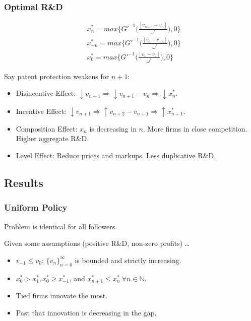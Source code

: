 \documentclass{beamer}
\begin{document}
\begin{frame}[t]\frametitle{Optimal R\&D}
  \!\!\!\!\!\!\!\!\!\!\!\! %
  \begin{align} \label{eq:ss_rd_policies}
    &x_n^*    = max \big\{G'^{-1}\Bigg(\frac{[v_{n+1} - v_n]}{\omega^*}\Bigg)   ,0\}\\
    &x_{-n}^* = max \big\{G'^{-1}\Bigg(\frac{[v_0  - v_{-n}]}{\omega^*}\Bigg)   ,0\}\\
    &x_0^*    = max \big\{G'^{-1}\Bigg(\frac{[v_1     - v_0]}{\omega^*}\Bigg)   ,0\}
  \end{align}

  Say patent protection weakens for $n + 1$:
  \begin{itemize}
    \item<2-> Disincentive Effect: $\downarrow v_{n+1} \Rightarrow \downarrow v_{n+1} - v_n \Rightarrow \downarrow x_n^*$.
    \item<3-> Incentive Effect: $\downarrow v_{n+1} \Rightarrow \uparrow v_{n+2} - v_{n+1} \Rightarrow \uparrow x_{n+1}^*$.
    \item<4-> Composition Effect: $x_n$ is decreasing in $n$. More firms in close competition. Higher aggregate R\&D.
    \item<5-> Level Effect: Reduce prices and markups.  Less duplicative R\&D.
  \end{itemize}
\end{frame}

\subsection{Results}
\label{sub:results}
\begin{frame}[t]\frametitle{Uniform Policy} 
	\vspace{2mm}
Problem is identical for all followers.

\vspace{2mm}
Given some assumptions (positive R\&D, non-zero profits) \ldots
\begin{itemize}
	\vspace{2mm}
  \item<+-> $v_{-1} \leq v_0$; $\{v_n\}_{n=0}^{\infty}$ is bounded and strictly increasing.
  \vspace{2mm}
  \item<+-> $x_0^* > x_1^*, x_0^* \geq x_{-1}^*$, and $x_{n+1}^* \leq x_n^*\ \forall n \in \mathbb{N}$.
  \vspace{2mm}
  \item<2> Tied firms innovate the most.
  \vspace{2mm}
  \item<2> Past that innovation is decreasing in the gap.
\end{itemize}
\end{frame}
\end{document}
